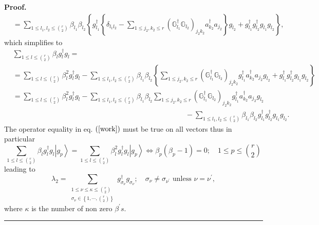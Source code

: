 \documentclass[aps,preprint,amsfonts,amssymb,showpacs,showkeys]{revtex4}%
\newenvironment{proof}[1][Proof]{\noindent\textbf{#1.} }{\ \rule{0.5em}{0.5em}}
\begin{document}
\begin{proof}
\begin{align}
&  =\sum_{1\leq l_{1},l_{2}\leq\binom{r}{2}}\beta_{l_{1}}\beta_{l_{2}}\left\{
g_{l_{1}}^{\dagger}\left\{  \delta_{l_{1}l_{2}}-\sum_{1\leq j_{2},k_{2}\leq
r}\left(  \mathbb{G}_{l_{1}}^{\dagger}\mathbb{G}_{l_{2}}\right)  _{j_{2}k_{2}%
}a_{k_{2}}^{\dagger}a_{j_{2}}\right\}  g_{l_{2}}+g_{l_{1}}^{\dagger}g_{l_{2}%
}^{\dagger}g_{l_{1}}g_{l_{2}}\right\}  ,
\end{align}
which simplifies to%
\begin{align}
&  \sum_{1\leq l\leq\binom{r}{2}}\beta_{l}g_{l}^{\dagger}g_{l}=\nonumber\\
&  =\sum_{1\leq l\leq\binom{r}{2}}\beta_{l}^{2}g_{l}^{\dagger}g_{l}%
-\sum_{1\leq l_{1},l_{2}\leq\binom{r}{2}}\beta_{l_{1}}\beta_{l_{2}}\left\{
\sum_{1\leq j_{2},k_{2}\leq r}\left(  \mathbb{G}_{l_{1}}^{\dagger}%
\mathbb{G}_{l_{2}}\right)  _{j_{2}k_{2}}g_{l_{1}}^{\dagger}a_{k_{2}}^{\dagger
}a_{j_{2}}g_{l_{2}}+g_{l_{1}}^{\dagger}g_{l_{2}}^{\dagger}g_{l_{1}}g_{l_{2}%
}\right\} \nonumber\\
&  =\sum_{1\leq l\leq\binom{r}{2}}\beta_{l}^{2}g_{l}^{\dagger}g_{l}%
-\sum_{1\leq l_{1},l_{2}\leq\binom{r}{2}}\beta_{l_{1}}\beta_{l_{2}}\sum_{1\leq
j_{2},k_{2}\leq r}\left(  \mathbb{G}_{l_{1}}^{\dagger}\mathbb{G}_{l_{2}%
}\right)  _{j_{2}k_{2}}g_{l_{1}}^{\dagger}a_{k_{2}}^{\dagger}a_{j_{2}}%
g_{l_{2}}\nonumber\\
&  \qquad\qquad\qquad\qquad\qquad\qquad\qquad\qquad\qquad\qquad\qquad
\qquad-\sum_{1\leq l_{1},l_{2}\leq\binom{r}{2}}\beta_{l_{1}}\beta_{l_{2}%
}g_{l_{1}}^{\dagger}g_{l_{2}}^{\dagger}g_{l_{1}}g_{l_{2}}. \label{work}%
\end{align}
The operator equality in eq. $\left(  \ref{work}\right)  $ must be true on all
vectors thus in particular
\begin{equation}
\sum_{1\leq l\leq\binom{r}{2}}\beta_{l}g_{l}^{\dagger}g_{l}\left\vert
g_{p}\right\rangle =\sum_{1\leq l\leq\binom{r}{2}}\beta_{l}^{2}g_{l}^{\dagger
}g_{l}\left\vert g_{p}\right\rangle \Longleftrightarrow\beta_{p}\left(
\beta_{p}-1\right)  =0;\quad1\leq p\leq\binom{r}{2}%
\end{equation}
leading to
\begin{equation}
\lambda_{2}=\sum_{\substack{1\leq\nu\leq\kappa\leq\binom{r}{2}\\\sigma_{\nu
}\in\left\{  1,\cdots,\binom{r}{2}\right\}  }}g_{\sigma_{\nu}}^{\dagger
}g_{\sigma_{\nu}};\quad\sigma_{\nu}\neq\sigma_{\nu^{\prime}}\text{ unless }%
\nu=\nu^{\prime},
\end{equation}
where $\kappa$ is the number of non zero $\beta^{\prime}s.$
\end{proof}
\end{document}
